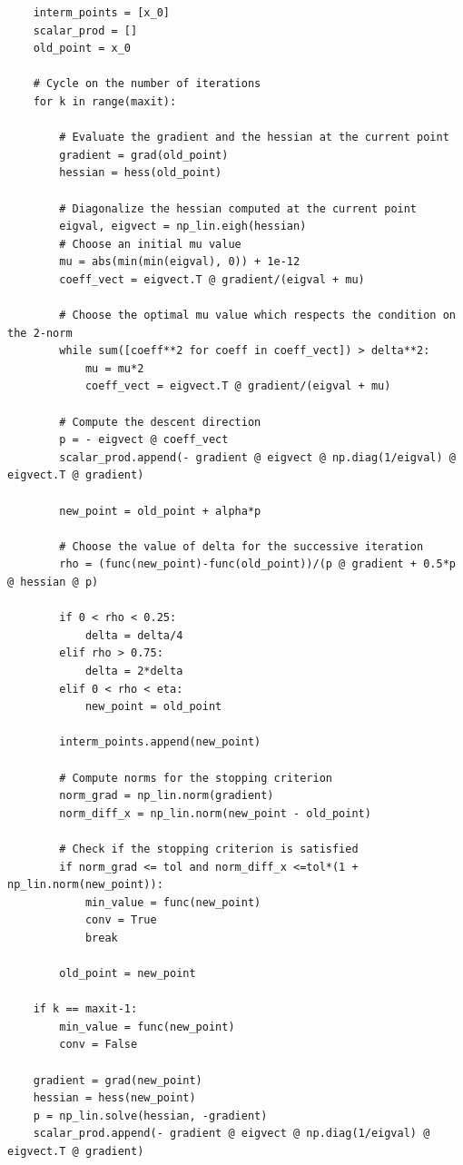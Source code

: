 \documentclass[a4paper,11pt]{article}
\begin{document}
\begin{verbatim}
    interm_points = [x_0]
    scalar_prod = []
    old_point = x_0

    # Cycle on the number of iterations
    for k in range(maxit):

        # Evaluate the gradient and the hessian at the current point
        gradient = grad(old_point)
        hessian = hess(old_point)

        # Diagonalize the hessian computed at the current point
        eigval, eigvect = np_lin.eigh(hessian)
        # Choose an initial mu value
        mu = abs(min(min(eigval), 0)) + 1e-12
        coeff_vect = eigvect.T @ gradient/(eigval + mu)

        # Choose the optimal mu value which respects the condition on the 2-norm
        while sum([coeff**2 for coeff in coeff_vect]) > delta**2:
            mu = mu*2
            coeff_vect = eigvect.T @ gradient/(eigval + mu)

        # Compute the descent direction
        p = - eigvect @ coeff_vect
        scalar_prod.append(- gradient @ eigvect @ np.diag(1/eigval) @ eigvect.T @ gradient)

        new_point = old_point + alpha*p

        # Choose the value of delta for the successive iteration
        rho = (func(new_point)-func(old_point))/(p @ gradient + 0.5*p @ hessian @ p)

        if 0 < rho < 0.25:
            delta = delta/4
        elif rho > 0.75:
            delta = 2*delta
        elif 0 < rho < eta:
            new_point = old_point
        
        interm_points.append(new_point)

        # Compute norms for the stopping criterion
        norm_grad = np_lin.norm(gradient)
        norm_diff_x = np_lin.norm(new_point - old_point)

        # Check if the stopping criterion is satisfied
        if norm_grad <= tol and norm_diff_x <=tol*(1 + np_lin.norm(new_point)):
            min_value = func(new_point)
            conv = True
            break

        old_point = new_point

    if k == maxit-1:
        min_value = func(new_point)
        conv = False

    gradient = grad(new_point)
    hessian = hess(new_point)
    p = np_lin.solve(hessian, -gradient)
    scalar_prod.append(- gradient @ eigvect @ np.diag(1/eigval) @ eigvect.T @ gradient)
    

\end{verbatim}
\end{document}
